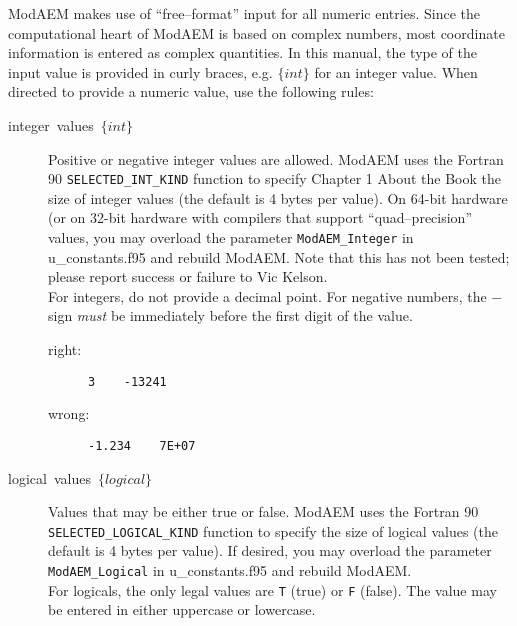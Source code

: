 ModAEM makes use of ``free--format'' input for all numeric entries.
Since the computational heart of ModAEM is based on complex numbers,
most coordinate information is entered as complex quantities. In this
manual, the type of the input value is provided in curly braces, e.g.
$\{int\}$ for an integer value. When directed to provide a numeric
value, use the following rules:
\begin{description}
\item [{integer~values~$\{int\}$}] Positive or negative integer values
are allowed. ModAEM uses the Fortran 90 \texttt{SELECTED\_INT\_KIND}
function to specify Chapter 1 About the Book the size of integer values
(the default is 4 bytes per value). On 64-bit hardware (or on 32-bit
hardware with compilers that support ``quad--precision'' values,
you may overload the parameter \texttt{ModAEM\_Integer} in \textsf{u\_constants.f95}
and rebuild ModAEM. Note that this has not been tested; please report
success or failure to Vic Kelson.\\
For integers, do not provide a decimal point. For negative numbers,
the $-$sign \emph{must} be immediately before the first digit of
the value.

\begin{description}
\item [{right:}] \texttt{3~~~~-13241}
\item [{wrong:}] \texttt{-1.234~~~~7E+07}
\end{description}
\item [{logical~values~$\{logical\}$}] Values that may be either true
or false. ModAEM uses the Fortran 90 \texttt{SELECTED\_LOGICAL\_KIND}
function to specify the size of logical values (the default is 4 bytes
per value). If desired, you may overload the parameter \texttt{ModAEM\_Logical}
in \textsf{u\_constants.f95} and rebuild ModAEM.\\
For logicals, the only legal values are \texttt{T} (true) or \texttt{F}
(false). The value may be entered in either uppercase or lowercase.


\end{description}
